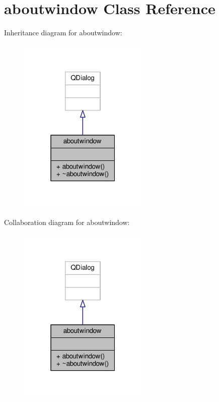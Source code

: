 \hypertarget{classaboutwindow}{}\section{aboutwindow Class Reference}
\label{classaboutwindow}


Inheritance diagram for aboutwindow\+:
\nopagebreak
\begin{figure}[H]
\begin{center}
\leavevmode
\includegraphics[width=175pt]{classaboutwindow__inherit__graph}
\end{center}
\end{figure}


Collaboration diagram for aboutwindow\+:
\nopagebreak
\begin{figure}[H]
\begin{center}
\leavevmode
\includegraphics[width=175pt]{classaboutwindow__coll__graph}
\end{center}
\end{figure}

